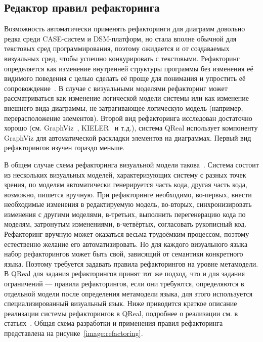 \subsection{Редактор правил рефакторинга}
Возможность автоматически применять рефакторинги для диаграмм довольно редка среди CASE-систем и \ac{DSM}-платформ, 
но стала вполне обычной для текстовых сред программирования, поэтому ожидается и от создаваемых визуальных сред, чтобы успешно конкурировать с текстовыми. 
Рефакторинг определяется как изменение внутренней структуры программы без изменения 
её видимого поведения с целью сделать её проще для понимания и упростить её сопровождение~\cite{fowler2003refactoring}. 
В случае с визуальными моделями рефакторинг может рассматриваться как изменение логической 
модели системы или как изменение внешнего вида диаграммы, не затрагивающее логическую 
модель (например, перерасположение элементов). Второй вид рефакторинга исследован 
достаточно хорошо (см. GraphViz~\cite{graphViz}, KIELER~\cite{kieler} и т.д.), система 
QReal использует компоненту GraphViz для автоматической раскладки элементов на диаграммах. 
Первый вид рефакторингов изучен гораздо меньше.

В общем случае схема рефакторинга визуальной модели такова~\cite{mens2007challenges}.
Система состоит из нескольких визуальных моделей, характеризующих систему с разных точек зрения, по моделям автоматически 
генерируется часть кода, другая часть кода, возможно, пишется вручную. При рефакторинге 
необходимо, во-первых, внести необходимые изменения в редактируемую модель, во-вторых, 
синхронизировать изменения с другими моделями, в-третьих, выполнить перегенерацию кода 
по моделям, затронутым изменениями, в-четвёртых, согласовать рукописный код. Рефакторинг 
вручную может оказаться весьма трудоёмким процессом, поэтому естественно желание его 
автоматизировать. Но для каждого визуального языка набор рефакторингов может быть свой, 
зависящий от семантики конкретного языка. Поэтому требуется задавать правила рефакторингов 
на уровне метамодели. В QReal для задания рефакторингов принят тот же подход, что и 
для задания ограничений --- правила рефакторингов, если они требуются, определяются 
в отдельной модели после определения метамодели языка, для этого используется специализированный 
визуальный язык. Ниже приводится краткое описание реализации системы рефакторингов в QReal, 
подробнее о реализации см. в статьях~\cite{kuzenkova2013refactoring, kuzenkova2012refactorings}. 
Общая схема разработки и применения правил рефакторинга представлена на рисунке~\ref{image:refactoring}.


